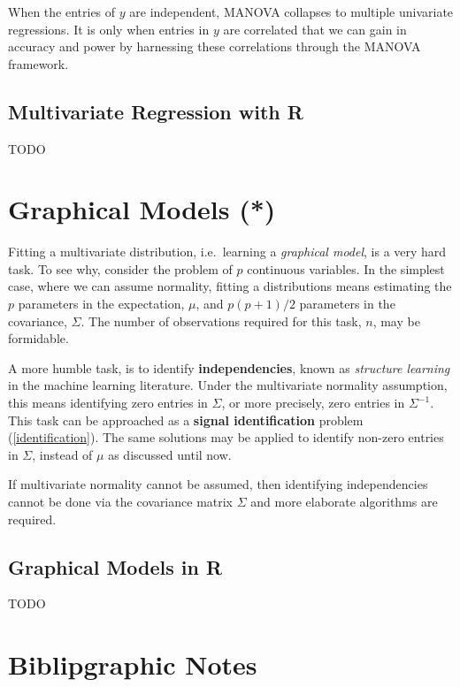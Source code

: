 \documentclass[]{book}
\theoremstyle{definition}
\theoremstyle{definition}
\theoremstyle{definition}
\theoremstyle{remark}
\begin{document}
When the entries of \(y\) are independent, MANOVA collapses to multiple
univariate regressions. It is only when entries in \(y\) are correlated
that we can gain in accuracy and power by harnessing these correlations
through the MANOVA framework.

\subsection{Multivariate Regression with
R}\label{multivariate-regression-with-r}

TODO

\section{Graphical Models (*)}\label{graphical-models}

Fitting a multivariate distribution, i.e.~learning a \emph{graphical
model}, is a very hard task. To see why, consider the problem of \(p\)
continuous variables. In the simplest case, where we can assume
normality, fitting a distributions means estimating the \(p\) parameters
in the expectation, \(\mu\), and \(p(p+1)/2\) parameters in the
covariance, \(\Sigma\). The number of observations required for this
task, \(n\), may be formidable.

A more humble task, is to identify \textbf{independencies}, known as
\emph{structure learning} in the machine learning literature. Under the
multivariate normality assumption, this means identifying zero entries
in \(\Sigma\), or more precisely, zero entries in \(\Sigma^{-1}\). This
task can be approached as a \textbf{signal identification} problem
(\ref{identification}). The same solutions may be applied to identify
non-zero entries in \(\Sigma\), instead of \(\mu\) as discussed until
now.

If multivariate normality cannot be assumed, then identifying
independencies cannot be done via the covariance matrix \(\Sigma\) and
more elaborate algorithms are required.

\subsection{Graphical Models in R}\label{graphical-models-in-r}

TODO

\section{Biblipgraphic Notes}\label{biblipgraphic-notes}
\end{document}
